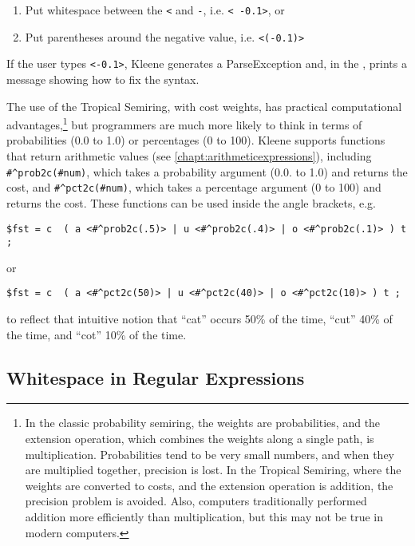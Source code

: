 \begin{enumerate}
\item
Put whitespace between the \texttt{<} and \texttt{-}, i.e.\@
\texttt{< -0.1>}, or
\item
Put parentheses around the negative value, i.e.\@
\texttt{<(-0.1)>}
\end{enumerate}

\noindent
If the user types \texttt{<-0.1>}, Kleene generates a
ParseException and, in the , prints a message showing how
to fix the syntax.

The use of the Tropical Semiring, with cost weights, has practical computational
advantages,\footnote{In the classic probability semiring, the weights are probabilities, and the extension
operation, which combines the weights along a single path, is multiplication.  Probabilities tend to be very small numbers, and when they are multiplied
together, precision is lost.  In the Tropical Semiring, where the weights are converted to costs, and the
extension operation is addition, the precision problem is avoided.  Also, computers traditionally
performed addition more efficiently than multiplication, but this may not be true in modern computers.} but programmers are much more likely to think in terms of
probabilities (0.0 to 1.0) or percentages (0 to 100).  Kleene supports functions that return arithmetic
values (see \ref{chapt:arithmeticexpressions}), including \verb!#^prob2c(#num)!, which takes a probability
argument (0.0. to 1.0) and returns the cost, and \verb!#^pct2c(#num)!, which takes a percentage argument
(0 to 100) and returns the cost.  These functions can be used inside the angle brackets, e.g.


\begin{Verbatim}
$fst = c  ( a <#^prob2c(.5)> | u <#^prob2c(.4)> | o <#^prob2c(.1)> ) t ;
\end{Verbatim}

\noindent
or

\begin{Verbatim}
$fst = c  ( a <#^pct2c(50)> | u <#^pct2c(40)> | o <#^pct2c(10)> ) t ;
\end{Verbatim}

\noindent
to reflect that intuitive notion that ``cat'' occurs 50\% of the time, ``cut'' 40\% of the time, and ``cot''
10\% of the time.


\subsection{Whitespace in Regular Expressions}
 
